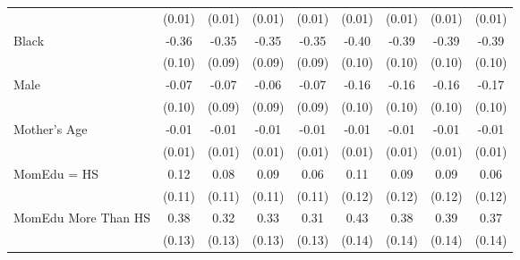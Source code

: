 {\begin{tabular}{l*{8}{c}}
                    &      (0.01)         &      (0.01)         &      (0.01)         &      (0.01)         &      (0.01)         &      (0.01)         &      (0.01)         &      (0.01)         \\
[1em]
Black               &       -0.36\sym{***}&       -0.35\sym{***}&       -0.35\sym{***}&       -0.35\sym{***}&       -0.40\sym{***}&       -0.39\sym{***}&       -0.39\sym{***}&       -0.39\sym{***}\\
                    &      (0.10)         &      (0.09)         &      (0.09)         &      (0.09)         &      (0.10)         &      (0.10)         &      (0.10)         &      (0.10)         \\
[1em]
Male                &       -0.07         &       -0.07         &       -0.06         &       -0.07         &       -0.16         &       -0.16         &       -0.16         &       -0.17\sym{*}  \\
                    &      (0.10)         &      (0.09)         &      (0.09)         &      (0.09)         &      (0.10)         &      (0.10)         &      (0.10)         &      (0.10)         \\
[1em]
Mother's Age        &       -0.01         &       -0.01         &       -0.01         &       -0.01         &       -0.01         &       -0.01         &       -0.01         &       -0.01         \\
                    &      (0.01)         &      (0.01)         &      (0.01)         &      (0.01)         &      (0.01)         &      (0.01)         &      (0.01)         &      (0.01)         \\
[1em]
MomEdu = HS         &        0.12         &        0.08         &        0.09         &        0.06         &        0.11         &        0.09         &        0.09         &        0.06         \\
                    &      (0.11)         &      (0.11)         &      (0.11)         &      (0.11)         &      (0.12)         &      (0.12)         &      (0.12)         &      (0.12)         \\
[1em]
MomEdu More Than HS &        0.38\sym{***}&        0.32\sym{**} &        0.33\sym{**} &        0.31\sym{**} &        0.43\sym{***}&        0.38\sym{***}&        0.39\sym{***}&        0.37\sym{***}\\
                    &      (0.13)         &      (0.13)         &      (0.13)         &      (0.13)         &      (0.14)         &      (0.14)         &      (0.14)         &      (0.14)         \\

\end{tabular}}
